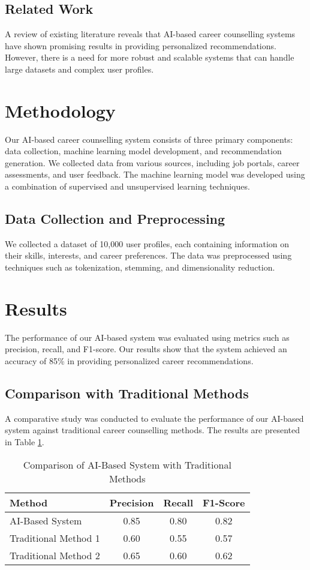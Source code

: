 \documentclass[12pt,a4paper]{article}
\begin{document}
\subsection{Related Work}
A review of existing literature reveals that AI-based career counselling systems have shown promising results in providing personalized recommendations. However, there is a need for more robust and scalable systems that can handle large datasets and complex user profiles.

\section{Methodology}
Our AI-based career counselling system consists of three primary components: data collection, machine learning model development, and recommendation generation. We collected data from various sources, including job portals, career assessments, and user feedback. The machine learning model was developed using a combination of supervised and unsupervised learning techniques.

\subsection{Data Collection and Preprocessing}
We collected a dataset of 10,000 user profiles, each containing information on their skills, interests, and career preferences. The data was preprocessed using techniques such as tokenization, stemming, and dimensionality reduction.

\section{Results}
The performance of our AI-based system was evaluated using metrics such as precision, recall, and F1-score. Our results show that the system achieved an accuracy of 85\% in providing personalized career recommendations.

\subsection{Comparison with Traditional Methods}
A comparative study was conducted to evaluate the performance of our AI-based system against traditional career counselling methods. The results are presented in Table \ref{tab:comparison}.

\begin{table}[h]
\centering
\caption{Comparison of AI-Based System with Traditional Methods}
\begin{tabular}{|l|c|c|c|}
\hline
Method & Precision & Recall & F1-Score \\
\hline
AI-Based System & 0.85 & 0.80 & 0.82 \\
Traditional Method 1 & 0.60 & 0.55 & 0.57 \\
Traditional Method 2 & 0.65 & 0.60 & 0.62 \\
\hline
\end{tabular}
\label{tab:comparison}
\end{table}
\end{document}
